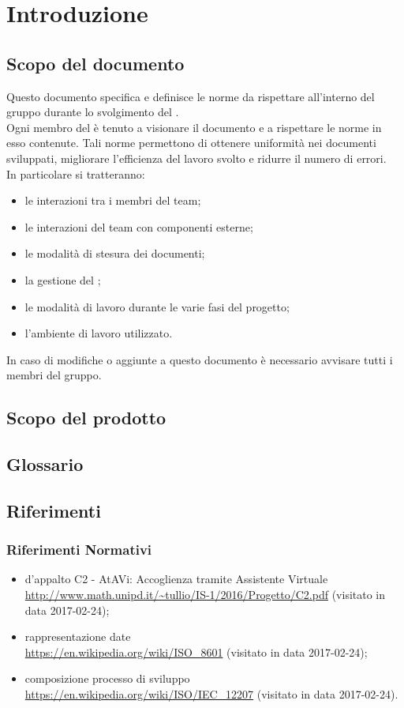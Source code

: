 \section{Introduzione}
	\subsection{Scopo del documento}
	Questo documento specifica e definisce le norme da rispettare all'interno del gruppo \GRUPPO{} durante lo svolgimento del  \PROGETTO. \\
	Ogni membro del  è tenuto a visionare il documento e a rispettare le norme in esso contenute. Tali norme permettono di ottenere uniformità nei documenti sviluppati,
	migliorare l'efficienza del lavoro svolto e ridurre il numero di errori. \\
	In particolare si tratteranno:
	\begin{itemize}
		\item le interazioni tra i membri del team;
		\item le interazioni del team con componenti esterne;
		\item le modalità di stesura dei documenti;
		\item la gestione del ;
		\item le modalità di lavoro durante le varie fasi del progetto;
		\item l'ambiente di lavoro utilizzato.
	\end{itemize}
	In caso di modifiche o aggiunte a questo documento è necessario avvisare tutti i membri del gruppo.
	\subsection{Scopo del prodotto}
		\SCOPO
	\subsection{Glossario}
		\GLOSSARIO
	\subsection{Riferimenti}
		\subsubsection{Riferimenti Normativi}
		\begin{itemize}
		\item {} d'appalto C2 - AtAVi: Accoglienza tramite Assistente Virtuale \\
		\url{http://www.math.unipd.it/~tullio/IS-1/2016/Progetto/C2.pdf} (visitato in data 2017-02-24);
		\item rappresentazione date \\
		\url{https://en.wikipedia.org/wiki/ISO_8601} (visitato in data 2017-02-24);
		\item composizione processo di sviluppo \\
		\url{https://en.wikipedia.org/wiki/ISO/IEC_12207} (visitato in data 2017-02-24).
\newpage
	\end{itemize}
